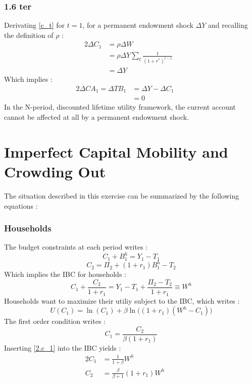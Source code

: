 \documentclass{article}
\begin{document}
\subsubsection*{1.6 ter} 
Derivating \eqref{c_t} for $t=1$, for a permanent endowment shock $\Delta Y$ and recalling the definition of $\rho$ :
\begin{alignat*}{2}
    \Delta C_1 &=   \rho \Delta W \quad&\\
    &= \rho \Delta Y \sum_t \frac{1}{(1+r^*)^{t-1}}\\
    &= \Delta Y
\end{alignat*}
Which implies :
\begin{alignat*}{2}
    \Delta CA_1 = \Delta TB_1 &= \Delta Y - \Delta C_1 \quad&\\
    &=   0
\end{alignat*}
In the N-period, discounted lifetime utility framework, the current account cannot be affected at all by a permanent endowment shock.
\newpage










\section{Imperfect Capital Mobility and Crowding Out}
The situation described in this exercise can be summarized by the following equations :
\subsubsection*{Households}
The budget constraints at each period writes :
\begin{equation}
    C_1 + B_1^h = Y_1 - T_1
\end{equation}
\begin{equation}
    C_2  = \Pi_2 + (1+r_1) B_1^h - T_2
\end{equation}
Which implies the IBC for households :
\begin{equation}
    C_1 + \frac{C_2}{1+r_1}  = Y_1 - T_1 + \frac{\Pi_2 - T_2}{1+r_1} \equiv W^h
\end{equation}
Households want to maximize their utiliy subject to the IBC, which writes :
\begin{equation}
    U(C_1)  = \ln(C_1) + \beta \ln\Big((1+r_1)(W^h-C_1)\Big)
\end{equation}
The first order condition writes :
\begin{equation}
    C_1  = \frac{C_2}{\beta(1+r_1)}
    \label{2.c_1}
\end{equation}
Inserting \eqref{2.c_1} into the IBC yields :
\begin{alignat}{2}
    C_1  &= \frac{1}{1 + \beta} W^h\quad&\\
    C_2  &= \frac{\beta}{\beta + 1} (1+r_1) W^h \quad&
\end{alignat}
\end{document}

